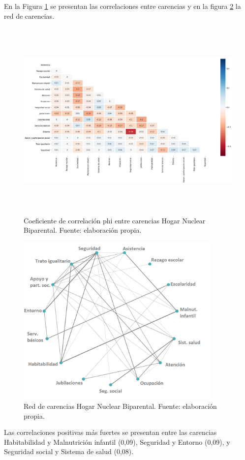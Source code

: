 \documentclass[12pt,letterpaper,spanish]{article}
\begin{document}
En la Figura \ref{HMBinuc} se presentan las correlaciones entre carencias y en la figura \ref{RedBinucpos} la red de carencias.
\begin{figure}[H]
    \centering
    \includegraphics[height=10cm]{Heatmaps/Heatmap_pearson_car_binuc.png}
    \caption{Coeficiente de correlación phi entre carencias Hogar Nuclear Biparental. Fuente: elaboración propia.}
    \label{HMBinuc}
\end{figure}

\begin{figure}[H]
  \centering
    \includegraphics[width=10cm]{Grafos/grafo_binuc_pos.png}
    \caption{Red de carencias Hogar Nuclear Biparental. Fuente: elaboración propia.}
    \label{RedBinucpos}
\end{figure}

Las correlaciones positivas más fuertes se presentan entre las carencias Habitabilidad y Malnutrición infantil (0,09), Seguridad y Entorno (0,09), y Seguridad social y Sistema de salud (0,08). 
\end{document}
